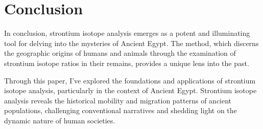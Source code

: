\documentclass[a4paper, 12pt]{article}
\begin{document}



\section{Conclusion}
In conclusion, strontium isotope analysis emerges as a potent and illuminating
tool for delving into the mysteries of Ancient Egypt. The method, which
discerns the geographic origins of humans and animals through the examination of
strontium isotope ratios in their remains, provides a unique lens into the past.

Through this paper, I've explored the foundations and applications of strontium
isotope analysis, particularly in the context of Ancient Egypt. Strontium isotope
analysis reveals the historical mobility and migration patterns of ancient
populations, challenging conventional narratives and shedding light on the
dynamic nature of human societies.
\end{document}
